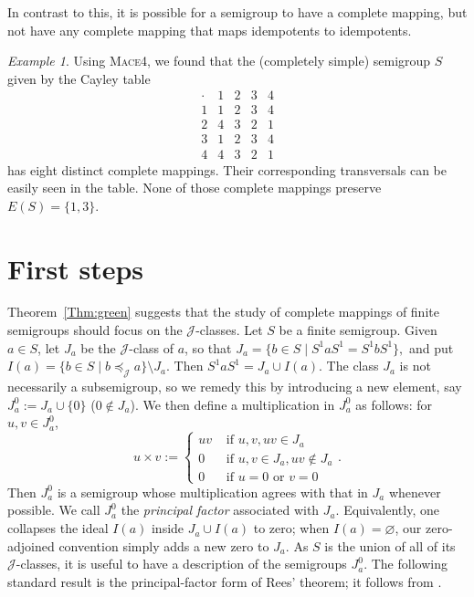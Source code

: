 \documentclass[11pt]{article}
\theoremstyle{plain}
\theoremstyle{remark}
\newtheorem{example}[theorem]{Example}
\theoremstyle{definition}
\theoremstyle{plain}
\newcommand\gj{\mathcal{J}}
\begin{document}
In contrast to this, it is possible for a semigroup to have a complete mapping, but not have any complete mapping that maps idempotents to idempotents.

\begin{example}
Using \textsc{Mace4}, we found that the (completely simple) semigroup $S$ given by the Cayley table
\[
\begin{array}{c|cccc}
\cdot & 1 & 2 & 3 & 4 \\
\hline
1 & 1 & 2 & 3 & 4 \\
2 & 4 & 3 & 2 & 1 \\
3 & 1 & 2 & 3 & 4 \\
4 & 4 & 3 & 2 & 1
\end{array}
\]
has eight distinct complete mappings. Their corresponding transversals can be easily seen in the table. None of those complete mappings preserve $E(S)=\{1,3\}$.
\end{example}

\section{First steps}
\label{Sec:firststeps}

Theorem~\ref{Thm:green} suggests that the study of complete mappings of finite semigroups should focus on the $\mathcal J$-classes. Let $S$ be a finite semigroup. Given $a\in S$, let $J_a$ be the $\mathcal J$-class of $a$, so that
\(J_a=\{b\in S\mid S^1aS^1=S^1bS^1\},\)
and put
\(I(a)=\{b\in S\mid b\preceq_{\gj}a\}\setminus J_a.\)
Then $S^1 aS^1 = J_a\cup I(a)$. The class $J_a$ is not necessarily a subsemigroup, so we remedy this by introducing a new element, say $J_a^0:=J_a\cup \{0\}$ ($0\notin J_a$). We then define a multiplication in $J_a^0$ as follows: for $u,v\in J_a^0$,
\[
u\times v:=
\begin{cases}
uv & \text{ if } u,v,uv\in J_a \\
0 & \text{ if } u,v\in J_a, uv\notin J_a\\
0 & \text{ if } u=0\text{ or }v=0
\end{cases}.
\]
Then $J_a^0$ is a semigroup whose multiplication agrees with that in $J_a$ whenever possible.
{We call $J_a^0$ the \emph{principal factor} associated with
$J_a$. Equivalently, one collapses the ideal $I(a)$ inside
$J_a\cup I(a)$ to zero; when $I(a)=\varnothing$, our zero-adjoined convention
simply adds a new zero to $J_a$.}
As $S$ is the union of all of its $\mathcal{J}$-classes, it is useful to have
a description of the semigroups $J_a^0$.
{The following standard result is the principal-factor form of
Rees' theorem; it follows from
\cite[Proposition~3.1.5, Proposition~3.2.1 and Theorem~3.2.3]{Howie}.}
\end{document}
